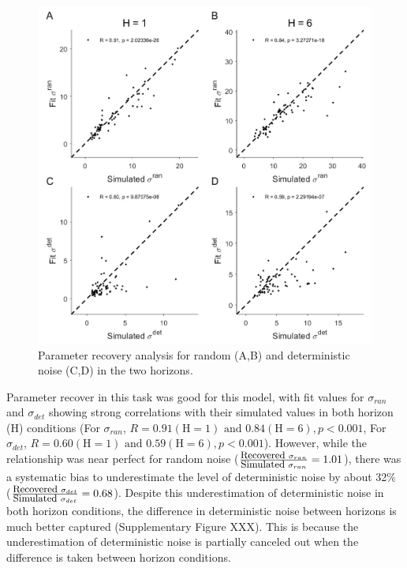 \documentclass[12pt]{article}
\begin{document}
{\begin{figure}[H]
	\begin{center}
		\includegraphics[width=\textwidth]{figures/RDBayes_parameterrecovery_subject_examplesession_randet.jpg}
		\caption{Parameter recovery analysis for random (A,B) and deterministic noise (C,D) in the two horizons.}
		\label{fig:paramrecover_main}
	\end{center}
\end{figure}

Parameter recover in this task was good for this model, with fit values for $\sigma_{ran}$ and $\sigma_{det}$ showing strong correlations with their simulated values in both horizon (H) conditions (For $\sigma_{ran}$, $R = 0.91 (\mbox{H} = 1) \mbox{ and } 0.84 (\mbox{H} = 6), p < 0.001$, For $\sigma_{det}$, $R = 0.60 (\mbox{H} = 1) \mbox{ and } 0.59 (\mbox{H} = 6), p < 0.001$). However, while the relationship was near perfect for random noise ($\frac{\mbox{\small Recovered } \sigma_{ran}}{\mbox{\small Simulated } \sigma_{ran}} = 1.01$), there was a systematic bias to underestimate the level of deterministic noise by about 32\% ($\frac{\mbox{\small Recovered } \sigma_{det}}{\mbox{\small Simulated } \sigma_{det}} = 0.68$). Despite this underestimation of deterministic noise in both horizon conditions, the difference in deterministic noise between horizons is much better captured (Supplementary Figure XXX). This is because the underestimation of deterministic noise is partially canceled out when the difference is taken between horizon conditions.
		
}
\end{document}
